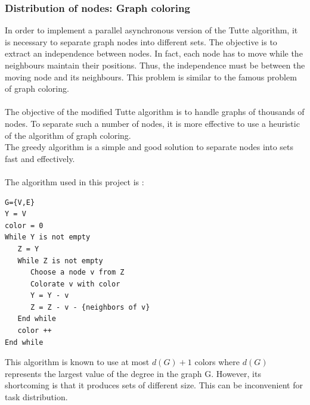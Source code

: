 \subsubsection{Distribution of nodes: Graph coloring}
In order to implement a parallel asynchronous version of the Tutte algorithm, it is necessary to separate graph nodes into different sets. The objective is to extract an independence between nodes. In fact, each node has to move while the neighbours maintain their positions. Thus, the independence must be between the moving node and its neighbours. This problem is similar to the famous problem of graph coloring.
\paragraph*{}
The objective of the modified Tutte algorithm is to handle graphs of thousands of nodes. To separate such a number of nodes, it is more effective to use a heuristic of the algorithm of graph coloring.\\
The greedy algorithm is a simple and good solution to separate nodes into sets fast and effectively.~\cite{pf}
\paragraph*{}
The algorithm used in this project is :
\begin{verbatim}
G={V,E}
Y = V
color = 0
While Y is not empty
   Z = Y
   While Z is not empty
      Choose a node v from Z
      Colorate v with color
      Y = Y - v
      Z = Z - v - {neighbors of v}
   End while
   color ++
End while
\end{verbatim}

This algorithm is known to use at most $d(G)+1$ colors where $d(G)$ represents the largest value of the degree in the graph G. However, its shortcoming is that it produces sets of different size. This can be inconvenient for task distribution.
